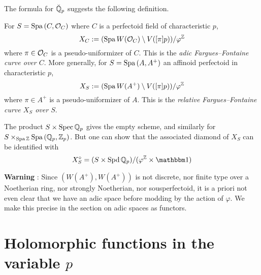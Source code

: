 \documentclass{article}
\begin{document}
The formula for $\breve{\mathbb{Q}}_p$ suggests the following definition.
\begin{dfn}

  For $S = \mathrm{Spa}\, (C , \mathcal{O}_C)$ where 
  $C$ is a perfectoid field of characteristic $p$,
  \[
    X_C := (\mathrm{Spa}\, W(\mathcal{O}_C) \setminus V([\pi] p)) / \varphi^{\mathbb{Z}}
  \]
  where $\pi \in \mathcal{O}_C$ is a pseudo-uniformizer of $C$.
  This is the \emph{adic Fargues--Fontaine curve over $C$}.
  More generally,
  for $S = \mathrm{Spa}\,(A , A^+)$ an affinoid perfectoid in characteristic $p$,
  \[
    X_S := (\mathrm{Spa}\, W(A^+) \setminus V([\pi] p)) / \varphi^{\mathbb{Z}}
  \]
  where $\pi \in A^+$ is a pseudo-uniformizer of $A$.
  This is the \emph{relative Fargues--Fontaine curve $X_S$ over $S$}.
\end{dfn}
The product $S \times \operatorname{Spec} \mathbb{Q}_p$ gives the empty scheme,
and similarly for $S \times_{\mathrm{Spa}\, \mathbb{Z}} \mathrm{Spa}\,(\mathbb{Q}_p , \mathbb{Z}_p)$.
But one can show that the associated diamond of $X_S$
can be identified with
\[
  X_S^\diamond = (S \times \SPD \bQ_p) / (\varphi^\bZ \times \id)
\]

\textbf{Warning} : 
Since $(W(A^+) , W(A^+))$ is not discrete,
nor finite type over a Noetherian ring, nor strongly Noetherian,
nor sousperfectoid,
it is a priori not even clear that we have an adic space
before modding by the action of $\varphi$.
We make this precise in the section on adic spaces as functors.

\section{Holomorphic functions in the variable $p$}
\end{document}
